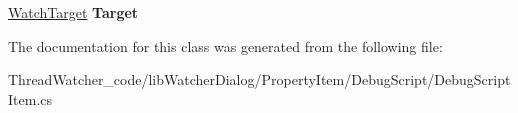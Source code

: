 \begin{DoxyCompactItemize}
\item 
\hypertarget{classlib_watcher_dialog_1_1_property_item_1_1_debug_script_1_1_debug_script_item_a72b6b972094f9f943ffb273598d932b2}{\hyperlink{classlib_watcher_dialog_1_1_debug_script_engine_1_1_property_1_1_watch_target}{Watch\+Target} {\bfseries Target}}\label{classlib_watcher_dialog_1_1_property_item_1_1_debug_script_1_1_debug_script_item_a72b6b972094f9f943ffb273598d932b2}

\end{DoxyCompactItemize}


The documentation for this class was generated from the following file\+:\begin{DoxyCompactItemize}
\item 
Thread\+Watcher\+\_\+code/lib\+Watcher\+Dialog/\+Property\+Item/\+Debug\+Script/Debug\+Script\+Item.\+cs\end{DoxyCompactItemize}
